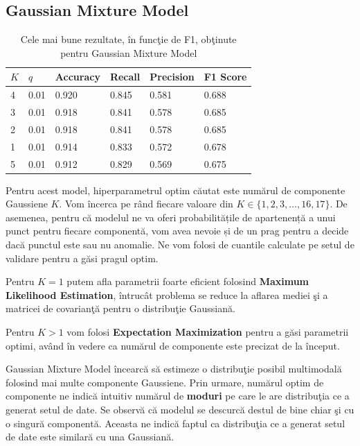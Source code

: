 \subsection{Gaussian Mixture Model}

\begin{table}[H]
  \centering
  \begin{tabularx}{\textwidth}{
      |X
      |X
      |X
      |X
      |X
      |X|
  }
  \hline
  $K$ & $q$ & {Accuracy} & {Recall} & {Precision} & {F1 Score} \\
  \hline
  \rowcolor{gray!20} 4 & 0.01 & 0.920 & 0.845 & 0.581 & 0.688  \\
  3	& 0.01 & 0.918	& 0.841 & 0.578 & 0.685 \\
  \rowcolor{gray!20} 2	& 0.01 & 0.918 & 0.841 & 0.578	& 0.685  \\
  1 & 0.01 & 0.914 & 0.833 & 0.572 & 0.678 \\
  \rowcolor{gray!20} 5 & 0.01 & 0.912	& 0.829 & 0.569	& 0.675  \\
  \hline
  \end{tabularx}
  \caption{Cele mai bune rezultate, în funcţie de F1, obţinute pentru Gaussian Mixture Model}
\end{table}



Pentru acest model, hiperparametrul optim 
căutat este numărul de componente Gaussiene $K$. Vom încerca pe rând fiecare valoare
din $K\in\{1, 2, 3, \ldots, 16, 17\}$. De asemenea, pentru că modelul 
ne va oferi probabilitățile de apartenență a unui punct pentru 
fiecare componentă, vom avea nevoie și de un prag pentru a decide 
dacă punctul este sau nu anomalie. Ne vom folosi de cuantile 
calculate pe setul de validare pentru a găsi pragul optim.

Pentru $K=1$ putem afla parametrii foarte eficient folosind 
\textbf{Maximum Likelihood Estimation}, întrucât problema 
se reduce la aflarea mediei şi a matricei de 
covarianţă pentru o distribuţie Gaussiană. 

Pentru $K > 1$ vom folosi \textbf{Expectation Maximization} 
pentru a găsi parametrii optimi, 
având în vedere ca numărul de componente este precizat de la început.

Gaussian Mixture Model încearcă să estimeze o distribuţie posibil multimodală 
folosind mai multe componente Gaussiene. Prin urmare, numărul optim de componente
ne indică intuitiv numărul de \textbf{moduri} pe care le are distribuţia ce a generat 
setul de date.
Se observă că modelul se descurcă destul de bine chiar şi cu o singură componentă. 
Aceasta ne indică faptul ca distribuţia ce a generat setul de date este 
similară cu una Gaussiană.

